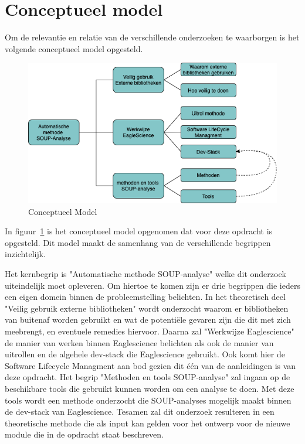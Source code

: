 \section{Conceptueel model}\label{sec:conceptueel-model}
Om de relevantie en relatie van de verschillende onderzoeken te waarborgen is het volgende conceptueel model opgesteld.
\begin{figure}
    \centering
    \includegraphics[width=12cm]{gfx/Conceptueel Model}
    \caption{Conceptueel Model}
    \label{fig:ConceptueelModel}
\end{figure}

In figuur~\ref{fig:ConceptueelModel} is het conceptueel model opgenomen dat voor deze opdracht is opgesteld. Dit model maakt de samenhang van de verschillende begrippen inzichtelijk.

Het kernbegrip is "Automatische methode SOUP-analyse" welke dit onderzoek uiteindelijk moet opleveren. Om hiertoe te komen zijn er drie begrippen die ieders een eigen domein binnen de probleemstelling belichten. In het theoretisch deel "Veilig gebruik externe bibliotheken" wordt onderzocht waarom er bibliotheken van buitenaf worden gebruikt en wat de potentiële gevaren zijn die dit met zich meebrengt, en eventuele remedies hiervoor. Daarna zal "Werkwijze Eaglescience" de manier van werken binnen Eaglescience belichten als ook de manier van uitrollen en de algehele dev-stack die Eaglescience gebruikt. Ook komt hier de Software Lifecycle Managment aan bod gezien dit één van de aanleidingen is van deze opdracht. Het begrip "Methoden en tools SOUP-analyse" zal ingaan op de beschikbare tools die gebruikt kunnen worden om een analyse te doen. Met deze tools wordt een methode onderzocht die SOUP-analyses mogelijk maakt binnen de dev-stack van Eaglescience. Tesamen zal dit onderzoek resulteren in een theoretische methode die als input kan gelden voor het ontwerp voor de nieuwe module die in de opdracht staat beschreven.


